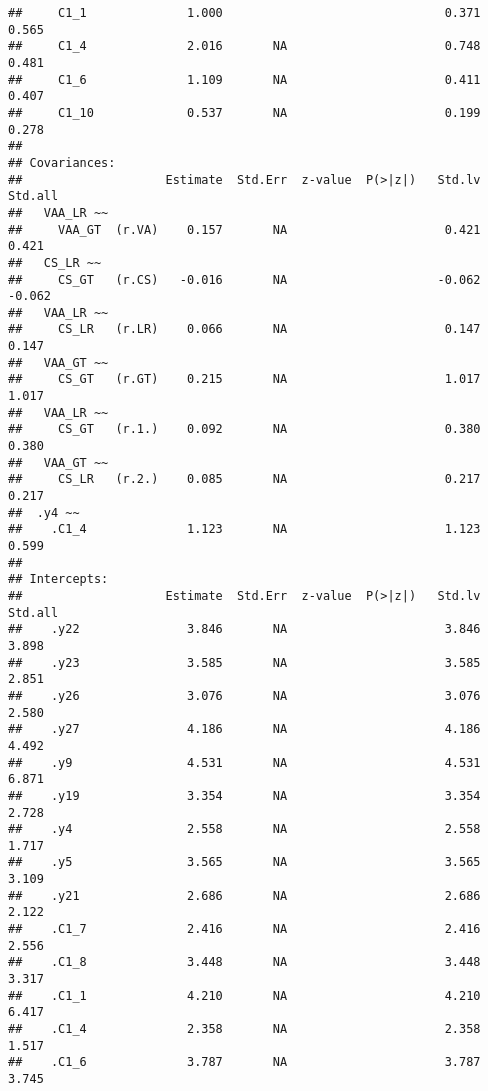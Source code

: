 \documentclass[
]{article}
\begin{document}
\begin{verbatim}
##     C1_1              1.000                               0.371    0.565
##     C1_4              2.016       NA                      0.748    0.481
##     C1_6              1.109       NA                      0.411    0.407
##     C1_10             0.537       NA                      0.199    0.278
## 
## Covariances:
##                    Estimate  Std.Err  z-value  P(>|z|)   Std.lv  Std.all
##   VAA_LR ~~                                                             
##     VAA_GT  (r.VA)    0.157       NA                      0.421    0.421
##   CS_LR ~~                                                              
##     CS_GT   (r.CS)   -0.016       NA                     -0.062   -0.062
##   VAA_LR ~~                                                             
##     CS_LR   (r.LR)    0.066       NA                      0.147    0.147
##   VAA_GT ~~                                                             
##     CS_GT   (r.GT)    0.215       NA                      1.017    1.017
##   VAA_LR ~~                                                             
##     CS_GT   (r.1.)    0.092       NA                      0.380    0.380
##   VAA_GT ~~                                                             
##     CS_LR   (r.2.)    0.085       NA                      0.217    0.217
##  .y4 ~~                                                                 
##    .C1_4              1.123       NA                      1.123    0.599
## 
## Intercepts:
##                    Estimate  Std.Err  z-value  P(>|z|)   Std.lv  Std.all
##    .y22               3.846       NA                      3.846    3.898
##    .y23               3.585       NA                      3.585    2.851
##    .y26               3.076       NA                      3.076    2.580
##    .y27               4.186       NA                      4.186    4.492
##    .y9                4.531       NA                      4.531    6.871
##    .y19               3.354       NA                      3.354    2.728
##    .y4                2.558       NA                      2.558    1.717
##    .y5                3.565       NA                      3.565    3.109
##    .y21               2.686       NA                      2.686    2.122
##    .C1_7              2.416       NA                      2.416    2.556
##    .C1_8              3.448       NA                      3.448    3.317
##    .C1_1              4.210       NA                      4.210    6.417
##    .C1_4              2.358       NA                      2.358    1.517
##    .C1_6              3.787       NA                      3.787    3.745

\end{verbatim}
\end{document}
